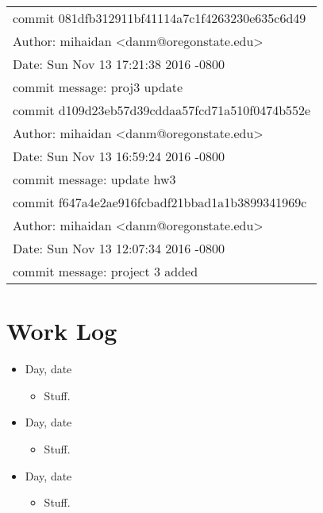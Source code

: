\documentclass[letterpaper,10pt,onecolumn]{IEEEtran}
\begin{document}
        \begin{center}
        \def\arraystretch{1.1}
        \begin{tabular}{ | p{8cm} | }
            \hline
            commit 081dfb312911bf41114a7c1f4263230e635c6d49 \\
            Author: mihaidan <danm@oregonstate.edu> \\
            Date:   Sun Nov 13 17:21:38 2016 -0800 \\
            commit message: proj3 update \\
            \hline
            commit d109d23eb57d39cddaa57fcd71a510f0474b552e \\
            Author: mihaidan <danm@oregonstate.edu> \\ 
            Date:   Sun Nov 13 16:59:24 2016 -0800 \\
            commit message: update hw3 \\
            \hline
            commit f647a4e2ae916fcbadf21bbad1a1b3899341969c \\
            Author: mihaidan <danm@oregonstate.edu> \\
            Date:   Sun Nov 13 12:07:34 2016 -0800 \\
            commit message: project 3 added \\
            \hline
        \end{tabular}
        \end{center}


    
    \vspace{6mm}
    
    
    \section*{Work Log}
    
    
    \begin{itemize}
        \item Day, date
            \begin{itemize} 
                \item Stuff.
        	\end{itemize}
        \item Day, date
            \begin{itemize} 
                \item Stuff.
        	\end{itemize}
        \item Day, date
            \begin{itemize} 
                \item Stuff.
        	\end{itemize}
    \end{itemize}
    
\end{document}
